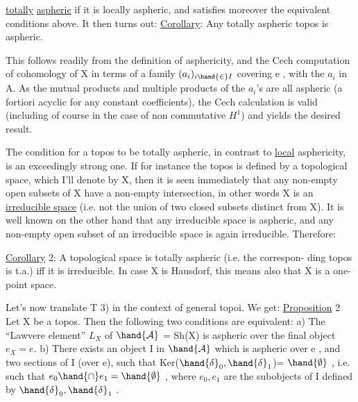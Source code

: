 \uline{totally} \uline{aspheric} if it  is  locally aspheric, and satisfies
moreover the equivalent conditions above. It then turns out:
\uline{Corollary}: Any totally aspheric topos is aspheric.

This follows readily from the definition of asphericity, and the
\hand{\v{}}Cech computation of cohomology of X in terms of a  family $(a_i)_{i\hand{\in}I}$
covering e , with the $a_i$ in A. As the mutual products and multiple
products of the $a_i$'s are all aspheric (a fortiori acyclic for any 
constant coefficients), the \hand{\v{}}Cech calculation is valid (including of course
in the case of non commutative $H^1$) and yields the desired result.

The condition for a topos to be totally aspheric, in contrast to
\uline{local} asphericity, is an exceedingly strong one. If for instance the
topos is defined by a topological space, which I'll denote by X, then it
is seen immediately that any  non-empty open subsets of X have a non-empty
intersection, in other words X is an \uline{irreducible space} (i.e.  not the union
of two closed subsets distinct from X). It is well known on the other hand
that any irreducible space is aspheric, and   any non-empty open subset
of an irreducible space is again irreducible. Therefore:

\uline{Corollary} 2: A topological space is totally aspheric (i.e. the correspon-%
ding topos is t.a.) iff it is irreducible. In case X is Hausdorf, this
means also that X is a one-point space.

Let's now translate T 3) in the context of general topoi. We get:
\uline{Proposition} 2 Let X be a  topos. Then the following two
conditions are equivalent:
a) The ``Lawvere element'' $L_X$ of $\hand{\mathcal{A}}$ = Sh(X) is aspheric 
 over the final object $e_X = e$.
b) There exists an object I in $\hand{\mathcal{A}}$ which is aspheric 
 over e \deleted{)}, and two sections  of I (over e), 
such that Ker($\hand{\delta}_0,\hand{\delta}_1$)= $\hand{\emptyset}$ , i.e. such that $e_0\hand{\cap}e_1 = \hand{\emptyset}$ , where
$e_0,e_1$ are the subobjects of I defined by $\hand{\delta}_0,\hand{\delta}_1$ .

